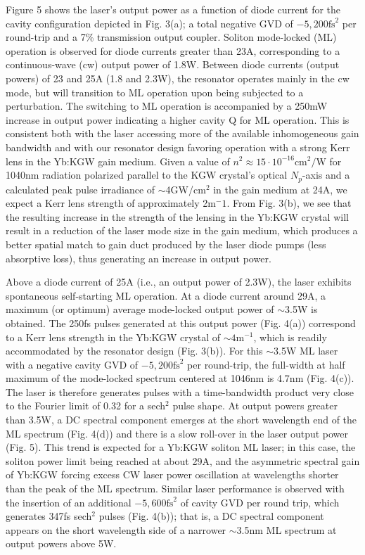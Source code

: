 Figure 5 shows the laser's output power as a function of diode current for the cavity configuration depicted in Fig. 3(a); a total negative GVD of $-5,200\text{fs}^2$ per round-trip and a 7\% transmission output coupler.
Soliton mode-locked (ML) operation is observed for diode currents greater than 23A, corresponding to a continuous-wave (cw) output power of 1.8W.
Between diode currents (output powers) of 23 and 25A (1.8 and 2.3W), the resonator operates mainly in the cw mode, but will transition to ML operation upon being subjected to a perturbation.
The switching to ML operation is accompanied by a 250mW increase in output
power indicating a higher cavity Q for ML operation.
This is consistent both with the laser accessing more of the available inhomogeneous gain bandwidth and with our resonator design favoring operation with a strong Kerr lens in the Yb:KGW gain medium.
Given a value of $n^2 \approx 15 \cdot 10^{-16}\text{cm}^2/\text{W}$ for 1040nm radiation polarized parallel to the KGW crystal’s optical $N_p$-axis\cite{Major_characterization_2003,Selivanov_nonlinear_2006,Vodchits_zscan_2006} and a calculated peak pulse irradiance of $\sim$4GW/cm$^2$ in the gain medium at 24A, we expect a Kerr lens strength of approximately 2m$^-1$.
From Fig. 3(b), we see that the resulting increase in the strength of the lensing in the Yb:KGW crystal will result in a reduction of the laser mode size in the gain medium, which produces a better spatial match to gain duct produced by the laser diode pumps (less absorptive loss), thus generating an increase in output power.


Above a diode current of 25A (i.e., an output power of 2.3W), the laser exhibits spontaneous self-starting ML operation.
At a diode current around 29A, a maximum (or optimum) average mode-locked output power of $\sim$3.5W is obtained.
The 250fs pulses generated at this output power (Fig. 4(a)) correspond to a Kerr lens strength in the Yb:KGW crystal of $\sim4 \text{m}^{-1}$, which is readily accommodated by the resonator design (Fig. 3(b)).
For this $\sim$3.5W ML laser with a negative cavity GVD of $-5,200\text{fs}^2$ per round-trip, the full-width at
half maximum of the mode-locked spectrum centered at 1046nm is 4.7nm (Fig. 4(c)).
The laser is therefore generates pulses with a time-bandwidth product very close to the Fourier limit of 0.32 for a sech$^2$ pulse shape.
At output powers greater than 3.5W, a DC spectral component emerges at the short wavelength end of the ML spectrum (Fig. 4(d)) and there is a slow roll-over in the laser output power (Fig. 5).
This trend is expected for a Yb:KGW soliton ML laser; in this case, the soliton power limit being reached at about 29A, and the asymmetric spectral gain of Yb:KGW forcing excess CW laser power oscillation at wavelengths shorter than the peak of the ML spectrum.
Similar laser performance is observed with the insertion of an additional $-5,600\text{fs}^2$ of cavity GVD per round trip, which generates 347fs sech$^2$ pulses (Fig. 4(b)); that is, a DC spectral component appears on the short wavelength side of a narrower $\sim$3.5nm ML spectrum at output powers above 5W.

